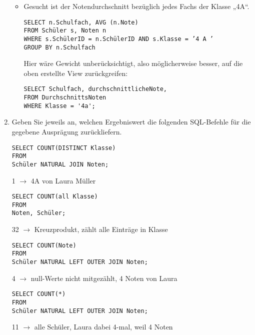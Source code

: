 \documentclass{lehramt-informatik-aufgabe}
\begin{document}
\begin{enumerate}
\begin{itemize}
%

\item Gesucht ist der Notendurchschnitt bezüglich jedes Fachs der Klasse
„4A“.

\begin{antwort}[muster]
\begin{verbatim}
SELECT n.Schulfach, AVG (n.Note)
FROM Schüler s, Noten n
WHERE s.SchülerID = n.SchülerID AND s.Klasse = ’4 A ’
GROUP BY n.Schulfach
\end{verbatim}

Hier wäre Gewicht unberücksichtigt, also möglicherweise besser, auf die oben erstellte
View zurückgreifen:

\begin{verbatim}
SELECT Schulfach, durchschnittlicheNote,
FROM DurchschnittsNoten
WHERE Klasse = '4a';
\end{verbatim}
\end{antwort}
\end{itemize}


\item Geben Sie jeweils an, welchen Ergebniswert die folgenden
SQL-Befehle für die gegebene Ausprägung zurückliefern.

\begin{verbatim}
SELECT COUNT(DISTINCT Klasse)
FROM
Schüler NATURAL JOIN Noten;
\end{verbatim}

\begin{antwort}[muster]
1 $\rightarrow$ 4A von Laura Müller
\end{antwort}

\begin{verbatim}
SELECT COUNT(all Klasse)
FROM
Noten, Schüler;
\end{verbatim}

\begin{antwort}[muster]
32 $\rightarrow$ Kreuzprodukt, zählt alle Einträge in Klasse
\end{antwort}

\begin{verbatim}
SELECT COUNT(Note)
FROM
Schüler NATURAL LEFT OUTER JOIN Noten;
\end{verbatim}

\begin{antwort}[muster]
4 $\rightarrow$ null-Werte nicht mitgezählt, 4 Noten von Laura
\end{antwort}

\begin{verbatim}
SELECT COUNT(*)
FROM
Schüler NATURAL LEFT OUTER JOIN Noten;
\end{verbatim}

\begin{antwort}[muster]
11 $\rightarrow$ alle Schüler, Laura dabei 4-mal, weil 4 Noten
\end{antwort}
\end{enumerate}
\end{document}
